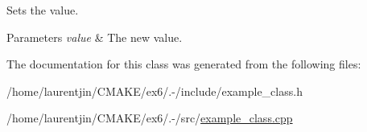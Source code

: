 Sets the value. 


\begin{DoxyParams}{Parameters}
{\em value} & The new value. \\
\hline
\end{DoxyParams}


The documentation for this class was generated from the following files\+:\begin{DoxyCompactItemize}
\item 
/home/laurentjin/\+C\+M\+A\+K\+E/ex6/.-\//include/example\+\_\+class.\+h\item 
/home/laurentjin/\+C\+M\+A\+K\+E/ex6/.-\//src/\hyperlink{example__class_8cpp}{example\+\_\+class.\+cpp}\end{DoxyCompactItemize}
